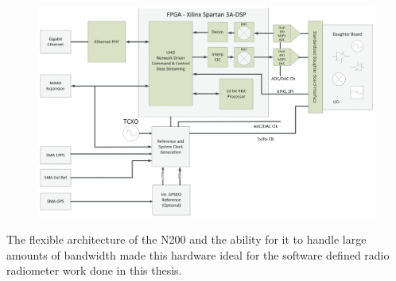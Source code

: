 {\begin{figure}[h!tb] 
\centering
\includegraphics[width=14cm]{Images/n200_block_edited}
\label{N200_block}
\end{figure}
}

The flexible architecture of the N200 and the ability for it to handle large amounts of bandwidth made this hardware ideal for the software defined radio radiometer work done in this thesis.




